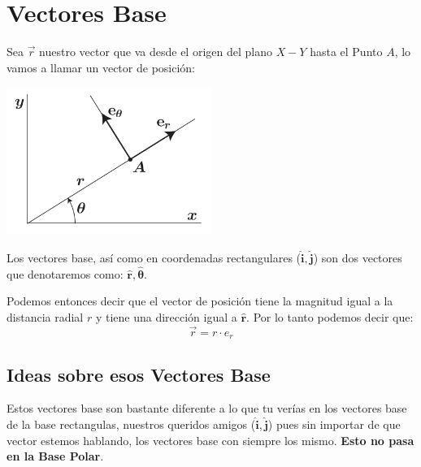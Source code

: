 \documentclass[12pt, fleqn]{report}                             %
\newcommand{\uvec}[1]{\boldsymbol{\hat{\textbf{$#1$}}}}         %
\begin{document}
        \clearpage
        \section{Vectores Base}

            Sea $\vec r$ nuestro vector que va desde el origen del plano $X-Y$ hasta el Punto $A$,
            lo vamos a llamar un vector de posición:

            \includegraphics[width=0.50\textwidth]{CoordenadasPolares.png}

            Los vectores base, así como en coordenadas rectangulares ($\uvec{i}, \uvec{j}$) son dos
            vectores que denotaremos como: $\uvec{r}, \uvec{\theta}$. 

            Podemos entonces decir que el vector de posición tiene la magnitud igual a la distancia
            radial $r$ y tiene una dirección igual a $\uvec{r}$.
            Por lo tanto podemos decir que:
            \begin{equation}
                \vec{r} = r \cdot e_r
            \end{equation}






            \subsection{Ideas sobre esos Vectores Base}

                Estos vectores base son bastante diferente a lo que tu verías en los vectores
                base de la base rectangulas, nuestros queridos amigos ($\uvec{i}, \uvec{j}$)
                pues sin importar de que vector estemos hablando, los vectores base con siempre 
                los mismo.
                \textbf{Esto no pasa en la Base Polar}.
\end{document}
